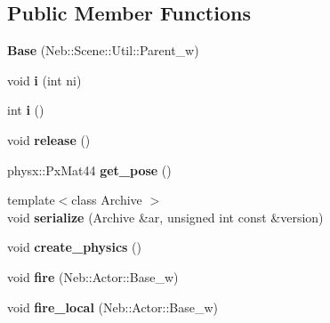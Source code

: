 \subsection*{Public Member Functions}
\begin{DoxyCompactItemize}
\item 
\hypertarget{classNeb_1_1Scene_1_1Base_a3a39fc37c9dbbea3bc331341a9f64be4}{{\bfseries Base} (Neb\-::\-Scene\-::\-Util\-::\-Parent\-\_\-w)}\label{classNeb_1_1Scene_1_1Base_a3a39fc37c9dbbea3bc331341a9f64be4}

\item 
\hypertarget{classNeb_1_1Scene_1_1Base_a250ec724083495c9aa1388a21e1a2f2d}{void {\bfseries i} (int ni)}\label{classNeb_1_1Scene_1_1Base_a250ec724083495c9aa1388a21e1a2f2d}

\item 
\hypertarget{classNeb_1_1Scene_1_1Base_a6a9930917682770354731d72481de56c}{int {\bfseries i} ()}\label{classNeb_1_1Scene_1_1Base_a6a9930917682770354731d72481de56c}

\item 
\hypertarget{classNeb_1_1Scene_1_1Base_abd3b47ebbbfa21ad01fa0414ad801ebe}{void {\bfseries release} ()}\label{classNeb_1_1Scene_1_1Base_abd3b47ebbbfa21ad01fa0414ad801ebe}

\item 
\hypertarget{classNeb_1_1Scene_1_1Base_ab1a1720a07c71246df641ac388219aab}{physx\-::\-Px\-Mat44 {\bfseries get\-\_\-pose} ()}\label{classNeb_1_1Scene_1_1Base_ab1a1720a07c71246df641ac388219aab}

\item 
\hypertarget{classNeb_1_1Scene_1_1Base_af98c5a6ef603a147b4de4f6ec148ec3f}{{\footnotesize template$<$class Archive $>$ }\\void {\bfseries serialize} (Archive \&ar, unsigned int const \&version)}\label{classNeb_1_1Scene_1_1Base_af98c5a6ef603a147b4de4f6ec148ec3f}

\item 
\hypertarget{classNeb_1_1Scene_1_1Base_a876e6ed9b1f7d461f413b3530bf5c3fe}{void {\bfseries create\-\_\-physics} ()}\label{classNeb_1_1Scene_1_1Base_a876e6ed9b1f7d461f413b3530bf5c3fe}

\item 
\hypertarget{classNeb_1_1Scene_1_1Base_aa44ae1c399f8e3c38c39d76fcd687b76}{void {\bfseries fire} (Neb\-::\-Actor\-::\-Base\-\_\-w)}\label{classNeb_1_1Scene_1_1Base_aa44ae1c399f8e3c38c39d76fcd687b76}

\item 
\hypertarget{classNeb_1_1Scene_1_1Base_a63f9ef79ba12301f812ad7dd0fba8c6d}{void {\bfseries fire\-\_\-local} (Neb\-::\-Actor\-::\-Base\-\_\-w)}\label{classNeb_1_1Scene_1_1Base_a63f9ef79ba12301f812ad7dd0fba8c6d}


\end{DoxyCompactItemize}
